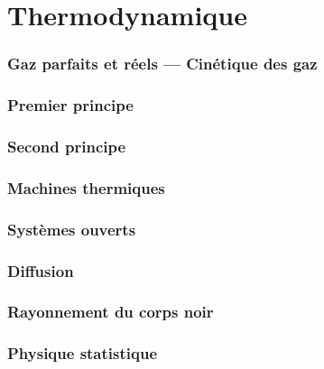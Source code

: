 \setcounter{part}{28}   %

\part{Thermodynamique}
\section{Gaz parfaits et réels --- Cinétique des gaz}



\section{Premier principe}






\section{Second principe}



\section{Machines thermiques}





\section{Systèmes ouverts}





\section{Diffusion}








\section{Rayonnement du corps noir}


\section{Physique statistique}

